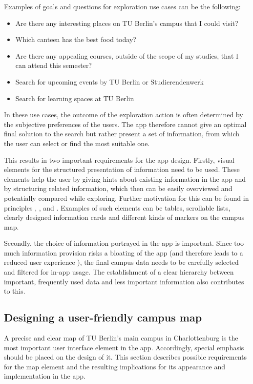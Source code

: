 Examples of goals and questions for exploration use cases can be the following:

\begin{itemize}
    \item Are there any interesting places on TU Berlin's campus that I could visit?
    \item Which canteen has the best food today?
    \item Are there any appealing courses, outside of the scope of my studies, that I can attend this semester?
    \item Search for upcoming events by TU Berlin or Studierendenwerk
    \item Search for learning spaces at TU Berlin
\end{itemize}

In these use cases, the outcome of the exploration action is often determined by the subjective preferences of the users. The app therefore cannot give an optimal final solution to the search but rather present a set of information, from which the user can select or find the most suitable one.

This results in two important requirements for the app design. Firstly, visual elements for the structured presentation of information need to be used. These elements help the user by giving hints about existing information in the app and by structuring related information, which then can be easily overviewed and potentially compared while exploring. Further motivation for this can be found in principles \cite{jakobs_law}, \cite{law_of_common_region}, \cite{hicks_law} and \cite{millers_law}. Examples of such elements can be tables, scrollable lists, clearly designed information cards and different kinds of markers on the campus map.

Secondly, the choice of information portrayed in the app is important. Since too much information provision risks a bloating of the app (and therefore leads to a reduced user experience \cite{hicks_law}), the final campus data needs to be carefully selected and filtered for in-app usage. The establishment of a clear hierarchy between important, frequently used data and less important information also contributes to this.

\subsection{Designing a user-friendly campus map} \label{sub:campus_user_experience}
A precise and clear map of TU Berlin's main campus in Charlottenburg is the most important user interface element in the app. Accordingly, special emphasis should be placed on the design of it. This section describes possible requirements for the map element and the resulting implications for its appearance and implementation in the app.


